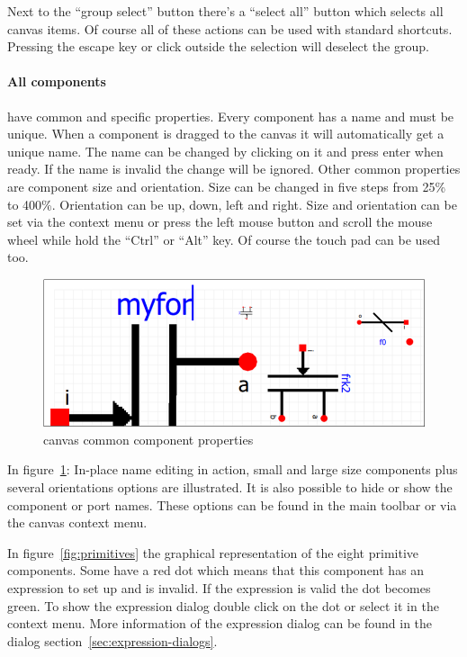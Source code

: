 Next to the ``group select'' button there's a ``select all'' button which selects all
canvas items. Of course all of these actions can be used with standard
shortcuts. Pressing the escape key or click outside the selection will deselect the group.

\paragraph{All components}have common and specific properties. Every component
has a name and must be unique. When a component is dragged to the canvas it will
automatically get a unique name. The name can be changed by clicking on it and
press enter when ready. If the name is invalid the change will be ignored. Other
common properties are component size and orientation. Size can be changed in
five steps from 25\% to 400\%. Orientation can be up, down, left and right. Size
and orientation can be set via the context menu or press the left mouse button
and scroll the mouse wheel while hold the ``Ctrl'' or ``Alt'' key. Of course the
touch pad can be used too.

\begin{figure}[here]
\begin{center}	
	\includegraphics[width=.70\linewidth]{pictures/component-common-properties}
	\caption{canvas common component properties}
	\label{fig:component-common-properties}
\end{center}
\end{figure}

In figure~\ref{fig:component-common-properties}: In-place name editing in
action, small and large size components plus several orientations options are
illustrated. It is also possible to hide or show the component or port names.
These options can be found in the main toolbar or via the canvas context menu.

In figure~\ref{fig:primitives} the graphical representation of the eight
primitive components. Some have a red dot which means that this component has an
expression to set up and is invalid. If the expression is valid the dot becomes
green. To show the expression dialog double click on the dot or select it in the
context menu. More information of the expression dialog can be found in the
dialog section~\ref{sec:expression-dialogs}.

